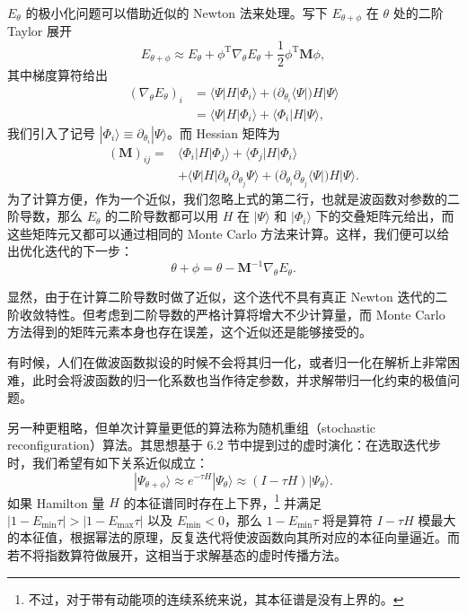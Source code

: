 $E_\theta$ 的极小化问题可以借助近似的 Newton 法来处理。写下 $E_{\theta+\phi}$ 在 $\theta$ 处的二阶 Taylor 展开
\begin{equation}
E_{\theta+\phi}\approx E_\theta+\phi^{\mathrm T}\nabla_\theta E_\theta+\frac12\phi^{\mathrm T}\mathbf M\phi,
\tag{7.6.6}
\end{equation}
其中梯度算符给出
\begin{equation}
\begin{aligned}
(\nabla_\theta E_\theta)_i
&=\langle\Psi|H|\Phi_i\rangle+(\partial_{\theta_i}\langle\Psi|)H|\Psi\rangle\\
&=\langle\Psi|H|\Phi_i\rangle+\langle\Phi_i|H|\Psi\rangle,
\end{aligned}
\tag{7.6.7}
\end{equation}
我们引入了记号 $|\Phi_i\rangle\equiv\partial_{\theta_i}|\Psi\rangle$。而 Hessian 矩阵为
\begin{equation}
\begin{aligned}
(\mathbf M)_{ij}={}&\langle\Phi_i|H|\Phi_j\rangle+\langle\Phi_j|H|\Phi_i\rangle\\
&+\langle\Psi|H|\partial_{\theta_i}\partial_{\theta_j}\Psi\rangle+(\partial_{\theta_i}\partial_{\theta_j}\langle\Psi|)H|\Psi\rangle.
\end{aligned}
\tag{7.6.8}
\end{equation}
为了计算方便，作为一个近似，我们忽略上式的第二行，也就是波函数对参数的二阶导数，那么 $E_\theta$ 的二阶导数都可以用 $H$ 在 $|\Psi\rangle$ 和 $|\Phi_i\rangle$ 下的交叠矩阵元给出，而这些矩阵元又都可以通过相同的 Monte Carlo 方法来计算。这样，我们便可以给出优化迭代的下一步：
\begin{equation}
\theta+\phi=\theta-\mathbf M^{-1}\nabla_\theta E_\theta.
\tag{7.6.9}
\end{equation}

显然，由于在计算二阶导数时做了近似，这个迭代不具有真正 Newton 迭代的二阶收敛特性。但考虑到二阶导数的严格计算将增大不少计算量，而 Monte Carlo 方法得到的矩阵元素本身也存在误差，这个近似还是能够接受的。

有时候，人们在做波函数拟设的时候不会将其归一化，或者归一化在解析上非常困难，此时会将波函数的归一化系数也当作待定参数，并求解带归一化约束的极值问题。

另一种更粗略，但单次计算量更低的算法称为随机重组（stochastic reconfiguration）算法。其思想基于 6.2 节中提到过的虚时演化：在选取迭代步时，我们希望有如下关系近似成立：
\begin{equation}
|\Psi_{\theta+\phi}\rangle\approx e^{-\tau H}|\Psi_\theta\rangle\approx (I-\tau H)|\Psi_\theta\rangle.
\tag{7.6.10}
\end{equation}
如果 Hamilton 量 $H$ 的本征谱同时存在上下界，\footnote{不过，对于带有动能项的连续系统来说，其本征谱是没有上界的。} 并满足 $|1-E_{\min}\tau|>|1-E_{\max}\tau|$ 以及 $E_{\min}<0$，那么 $1-E_{\min}\tau$ 将是算符 $I-\tau H$ 模最大的本征值，根据幂法的原理，反复迭代将使波函数向其所对应的本征向量逼近。而若不将指数算符做展开，这相当于求解基态的虚时传播方法。


